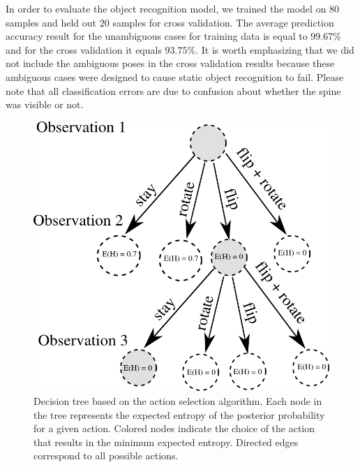 	In order to evaluate the object recognition model, we trained the model on $80$ samples and held out $20$ samples for cross validation. The average prediction accuracy result for the unambiguous cases for training data is equal to $99.67\%$ and for the cross validation it equals $93.75\%$. It is worth emphasizing that we did not include the ambiguous poses in the cross validation results because these ambiguous cases were designed to cause static object recognition to fail. Please note that all classification errors are due to confusion about whether the spine was visible or not.    
    
 
        

    \begin{figure}
    \centering
    		\includegraphics[width = 0.7\columnwidth]{pics/tree_small.png}
    	\caption{Decision tree based on the action selection algorithm. Each node in the tree represents the expected entropy of the posterior probability for a given action. Colored nodes indicate the choice of the action that results in the minimum expected entropy. Directed edges correspond to all possible actions.}
    	    	\label{fig:tree}
    \end{figure}
    
